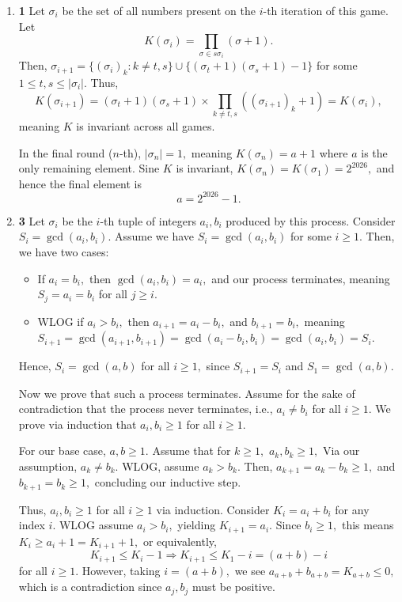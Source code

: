 \documentclass[12pt]{article}
\begin{document}
\begin{enumerate}
  \item \textbf{1} Let $\sigma_i$ be the set of all numbers present
    on the $i$-th iteration of this game. Let $$K(\sigma_i) =
    \prod_{\sigma \in s\sigma_i} (\sigma + 1).$$
    Then, $\sigma_{i + 1} = \{(\sigma_i)_k : k \neq t, s\} \cup
    \{(\sigma_{t} + 1)(\sigma_{s} + 1) - 1\}$ for some $1 \leq t, s
    \leq |\sigma_i|.$ Thus,
    $$
    K(\sigma_{i + 1}) = (\sigma_t + 1)(\sigma_s + 1) \times \prod_{k
    \neq t, s} ((\sigma_{i + 1})_k + 1) = K(\sigma_i),
    $$
    meaning $K$ is invariant across all games.

    In the final round ($n$-th), $|\sigma_n| = 1,$ meaning
    $K(\sigma_n) = a + 1$ where $a$ is the only remaining element.
    Sine $K$ is invariant, $K(\sigma_n) = K(\sigma_1)= 2^{2026},$ and
    hence the final element is
    $$
    a = 2^{2026} - 1.
    $$

  \item \textbf{3} Let $\sigma_i$ be the $i$-th tuple of integers
    $a_i, b_i$ produced by this process. Consider $S_i = \gcd(a_i,
    b_i).$ Assume we have $S_i = \gcd(a_i, b_i)$ for some $i \geq 1.$
    Then, we have two cases:
    \begin{itemize}
      \item If $a_i = b_i,$ then $\gcd(a_i, b_i) = a_i,$ and our
        process terminates, meaning $S_j = a_i = b_i$ for all $j \geq i.$

      \item WLOG if $a_i > b_i,$ then $a_{i + 1} = a_i - b_i,$ and
        $b_{i + 1} = b_i,$ meaning $S_{i + 1} = \gcd(a_{i + 1}, b_{i
        + 1}) = \gcd(a_i - b_i, b_i) = \gcd(a_i, b_i) = S_i.$
    \end{itemize}

    Hence, $S_i = \gcd(a, b)$ for all $i \geq 1,$ since $S_{i + 1} =
    S_i$ and $S_1 = \gcd(a, b).$

    Now we prove that such a process terminates. Assume for the sake
    of contradiction that the process never terminates, i.e., $a_i
    \neq b_i$ for all $i \geq 1.$ We prove via induction that $a_i,
    b_i \geq 1$ for all $i \geq 1.$

    For our base case, $a, b \geq 1$. Assume that for $k \geq 1,$
    $a_k, b_k \geq 1,$ Via our assumption, $a_k \neq b_k.$ WLOG,
    assume $a_k > b_k.$ Then, $a_{k + 1} = a_k - b_k \geq 1,$ and
    $b_{k + 1} = b_k \geq 1,$ concluding our inductive step.

    Thus, $a_i, b_i \geq 1$ for all $i \geq 1$ via induction.
    Consider $K_i = a_i + b_i$ for any index $i.$ WLOG assume $a_i >
    b_i,$ yielding $K_{i + 1} = a_i.$ Since $b_i \geq 1,$ this means
    $K_i \geq a_i + 1 = K_{i+ 1} + 1,$ or equivalently,
    $$
    K_{i + 1} \leq K_{i} - 1 \Rightarrow K_{i + 1} \leq K_1 - i = (a+b) - i
    $$
    for all $i \geq 1.$ However, taking $i = (a+b),$ we see $a_{a +
    b} + b_{a + b} = K_{a + b} \leq 0,$ which is a contradiction
    since $a_j, b_j$ must be positive.


\end{enumerate}
\end{document}
